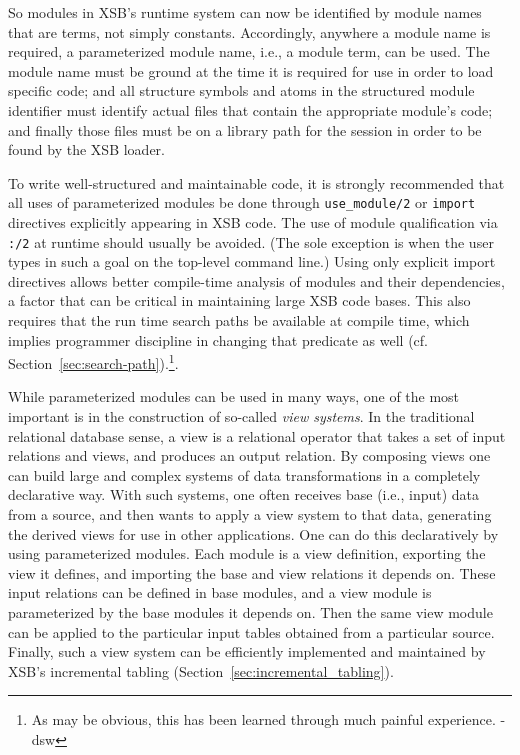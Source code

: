 So modules in XSB's runtime system can now be identified by module names
that are terms, not simply constants. Accordingly, anywhere a module
name is required, a parameterized module name, i.e., a module term,
can be used.  The module name must be ground at the time it is
required for use in order to load specific code; and all structure
symbols and atoms in the structured module identifier must identify
actual files that contain the appropriate module's code; and finally
those files must be on a library path for the session in order to be
found by the XSB loader.

To write well-structured and maintainable code, it is strongly
recommended that all uses of parameterized modules be done through
{\tt use\_module/2} or {\tt import} directives explicitly appearing in
XSB code.  The use of module qualification via {\tt :/2} at runtime
should usually be avoided.  (The sole exception is when the user types
in such a goal on the top-level command line.)  Using only explicit
import directives allows better compile-time analysis of modules and
their dependencies, a factor that can be critical in maintaining large
XSB code bases. This also requires that the run time search paths be
available at compile time, which implies programmer discipline in
changing that predicate as well
(cf. Section~\ref{sec:search-path}).\footnote{As may be obvious, this
  has been learned through much painful experience. -dsw}.

While parameterized modules can be used in many ways, one of the most
important is in the construction of so-called {\em view systems}.  In
the traditional relational database sense, a view is a relational
operator that takes a set of input relations and views, and produces
an output relation.  By composing views one can build large and
complex systems of data transformations in a completely declarative
way.  With such systems, one often receives base (i.e., input) data
from a source, and then wants to apply a view system to that data,
generating the derived views for use in other applications.  One can
do this declaratively by using parameterized modules.  Each module is
a view definition, exporting the view it defines, and importing the
base and view relations it depends on.  These input relations can be
defined in base modules, and a view module is parameterized by the
base modules it depends on.  Then the same view module can be applied
to the particular input tables obtained from a particular source.
Finally, such a view system can be efficiently implemented and
maintained by XSB's incremental tabling
(Section~\ref{sec:incremental_tabling}).


